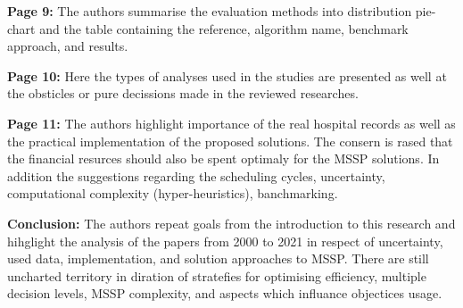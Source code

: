     \textbf{Page 9:}
    The authors summarise the evaluation methods into distribution pie-chart and the table containing the reference, algorithm name, benchmark approach, and results.
    
    \textbf{Page 10:}
    Here the types of analyses used in the studies are presented as well at the obsticles or pure decissions made in the reviewed researches.
    
    \textbf{Page 11:}
    The authors highlight importance of the real hospital records as well as the practical implementation of the proposed solutions. The consern is rased that the financial resurces should also be spent optimaly for the MSSP solutions. In addition the suggestions regarding the scheduling cycles, uncertainty, computational complexity (hyper-heuristics), banchmarking.
    
    \textbf{Conclusion:}
    The authors repeat goals from the introduction to this research and hihglight the analysis of the papers from 2000 to 2021 in respect of uncertainty, used data, implementation, and solution approaches to MSSP. There are still uncharted territory in diration of stratefies for optimising efficiency, multiple decision levels, MSSP complexity, and aspects which influance objectices usage.
